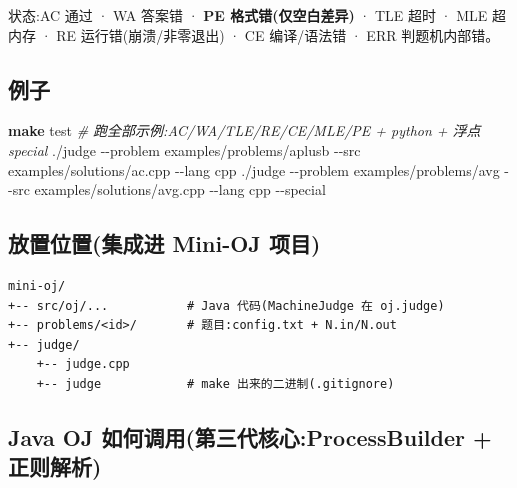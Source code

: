 \documentclass[
  11pt,
]{ctexart}
\newenvironment{Shaded}{\begin{snugshade}}{\end{snugshade}}
\newcommand{\AttributeTok}[1]{\textcolor[rgb]{0.13,0.29,0.53}{#1}}
\newcommand{\CommentTok}[1]{\textcolor[rgb]{0.56,0.35,0.01}{\textit{#1}}}
\newcommand{\ExtensionTok}[1]{#1}
\newcommand{\FunctionTok}[1]{\textcolor[rgb]{0.13,0.29,0.53}{\textbf{#1}}}
\newcommand{\NormalTok}[1]{#1}
\begin{document}
状态:AC 通过 · WA 答案错 · \textbf{PE 格式错(仅空白差异)} · TLE 超时 ·
MLE 超内存 · RE 运行错(崩溃/非零退出) · CE 编译/语法错 · ERR
判题机内部错。

\hypertarget{ux4f8bux5b50}{%
\subsection{例子}\label{ux4f8bux5b50}}

\begin{Shaded}
\begin{Highlighting}[]
\FunctionTok{make}\NormalTok{ test       }\CommentTok{\# 跑全部示例:AC/WA/TLE/RE/CE/MLE/PE + python + 浮点 special}
\ExtensionTok{./judge} \AttributeTok{{-}{-}problem}\NormalTok{ examples/problems/aplusb }\AttributeTok{{-}{-}src}\NormalTok{ examples/solutions/ac.cpp  }\AttributeTok{{-}{-}lang}\NormalTok{ cpp}
\ExtensionTok{./judge} \AttributeTok{{-}{-}problem}\NormalTok{ examples/problems/avg    }\AttributeTok{{-}{-}src}\NormalTok{ examples/solutions/avg.cpp }\AttributeTok{{-}{-}lang}\NormalTok{ cpp }\AttributeTok{{-}{-}special}
\end{Highlighting}
\end{Shaded}

\hypertarget{ux653eux7f6eux4f4dux7f6eux96c6ux6210ux8fdb-mini-oj-ux9879ux76ee}{%
\subsection{放置位置(集成进 Mini-OJ
项目)}\label{ux653eux7f6eux4f4dux7f6eux96c6ux6210ux8fdb-mini-oj-ux9879ux76ee}}

\begin{verbatim}
mini-oj/
+-- src/oj/...           # Java 代码(MachineJudge 在 oj.judge)
+-- problems/<id>/       # 题目:config.txt + N.in/N.out
+-- judge/
    +-- judge.cpp
    +-- judge            # make 出来的二进制(.gitignore)
\end{verbatim}

\hypertarget{java-oj-ux5982ux4f55ux8c03ux7528ux7b2cux4e09ux4ee3ux6838ux5fc3processbuilder-ux6b63ux5219ux89e3ux6790}{%
\subsection{Java OJ 如何调用(第三代核心:ProcessBuilder +
正则解析)}\label{java-oj-ux5982ux4f55ux8c03ux7528ux7b2cux4e09ux4ee3ux6838ux5fc3processbuilder-ux6b63ux5219ux89e3ux6790}}
\end{document}
